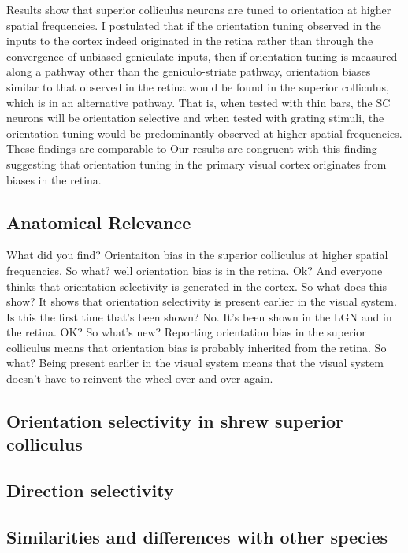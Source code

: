 Results show that superior colliculus neurons are tuned to orientation at higher spatial frequencies. I postulated that if the orientation tuning observed in the inputs to the cortex indeed originated in the retina rather than through the convergence of unbiased geniculate inputs, then if orientation tuning is measured along a pathway other than the geniculo-striate pathway, orientation biases similar to that observed in the retina would be found in the superior colliculus, which is in an alternative pathway. That is, when tested with thin bars, the SC neurons will be orientation selective and when tested with grating stimuli, the orientation tuning would be predominantly observed at higher spatial frequencies. These findings are comparable to  Our results are congruent with this finding suggesting that orientation tuning in the primary visual cortex originates from biases in the retina. 



\subsection{Anatomical Relevance}

What did you find?
Orientaiton bias in the superior colliculus at higher spatial frequencies.
So what?
well orientation bias is in the retina.
Ok?
And everyone thinks that orientation selectivity is generated in the cortex.
So what does this show?
It shows that orientation selectivity is present earlier in the visual system. 
Is this the first time that's been shown?
No. It's been shown in the LGN and in the retina.
OK? So what's new?
Reporting orientation bias in the superior colliculus means that orientation bias is probably inherited from the retina.
So what?
Being present earlier in the visual system means that the visual system doesn't have to reinvent the wheel over and over again.

\subsection{Orientation selectivity in shrew superior colliculus}
\subsection{Direction selectivity}
\subsection{Similarities and differences with other species}


